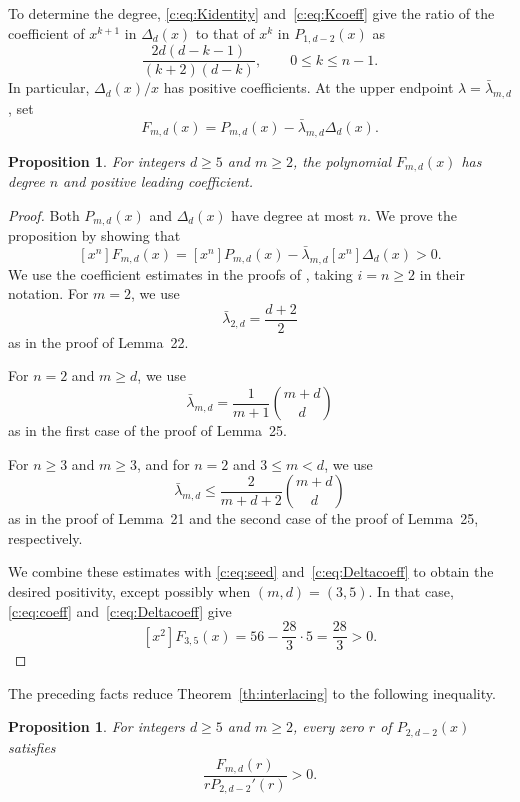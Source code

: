 \documentclass[10pt,a4paper]{article}
\numberwithin{equation}{section}
\newtheorem{proposition}[theorem]{Proposition}
\theoremstyle{remark}\newtheorem{remark}[theorem]{Remark}
\begin{document}
To determine the degree, \eqref{c:eq:Kidentity} and~\eqref{c:eq:Kcoeff}
give the ratio of the coefficient of $x^{k+1}$ in $\Delta_d(x)$ to that
of $x^k$ in $P_{1,d-2}(x)$ as
\begin{equation}\label{c:eq:Deltacoeff}
 \frac{2d(d-k-1)}{(k+2)(d-k)},\qquad 0\le k\le n-1.
\end{equation}
In particular, $\Delta_d(x)/x$ has positive coefficients.
At the upper endpoint $\lambda=\bar\lambda_{m,d}$, set
\[
 F_{m,d}(x)=P_{m,d}(x)-\bar\lambda_{m,d}\Delta_d(x).
\]
\begin{proposition}\label{c:prop:leading}
For integers $d\ge5$ and $m\ge2$, the polynomial $F_{m,d}(x)$ has
degree $n$ and positive leading coefficient.
\end{proposition}
\begin{proof}
Both $P_{m,d}(x)$ and $\Delta_d(x)$ have degree at most $n$.
We prove the proposition by showing that
\[
 [x^n]F_{m,d}(x)
 =[x^n]P_{m,d}(x)-\bar\lambda_{m,d}[x^n]\Delta_d(x)>0.
\]
We use the coefficient estimates in the proofs of
\cite[Lemmas~21, 22, and~25]{LNR}, taking $i=n\ge2$ in their notation.
For $m=2$, we use
\[
 \bar\lambda_{2,d}=\frac{d+2}{2}
\]
as in the proof of Lemma~22.

For $n=2$ and $m\ge d$, we use
\[
 \bar\lambda_{m,d}=\frac{1}{m+1}\binom{m+d}{d}
\]
as in the first case of the proof of Lemma~25.

For $n\ge3$ and $m\ge3$, and for $n=2$ and $3\le m<d$,
we use
\[
 \bar\lambda_{m,d}\le\frac{2}{m+d+2}\binom{m+d}{d}
\]
as in the proof of Lemma~21 and the second case of the proof of
Lemma~25, respectively.

We combine these estimates with \eqref{c:eq:seed}
and~\eqref{c:eq:Deltacoeff} to obtain the desired positivity,
except possibly when $(m,d)=(3,5)$.
In that case, \eqref{c:eq:coeff} and~\eqref{c:eq:Deltacoeff} give
\[
 [x^2]F_{3,5}(x)=56-\frac{28}{3}\cdot5=\frac{28}{3}>0.
\]
\end{proof}

The preceding facts reduce Theorem~\ref{th:interlacing} to the following
inequality.

\begin{proposition}\label{c:prop:endpoint}
For integers $d\ge5$ and $m\ge2$, every zero $r$ of $P_{2,d-2}(x)$ satisfies
\begin{equation}\label{c:eq:endpointnodes}
 \frac{F_{m,d}(r)}{rP_{2,d-2}'(r)}>0.
\end{equation}
\end{proposition}
\end{document}
